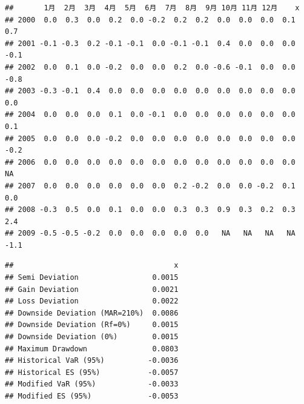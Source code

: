 \documentclass{article}\usepackage[]{graphicx}\usepackage[]{color}
\makeatletter
\newenvironment{kframe}{%
 \def\at@end@of@kframe{}%
 \ifinner\ifhmode%
  \def\at@end@of@kframe{\end{minipage}}%
  \begin{minipage}{\columnwidth}%
 \fi\fi%
 \def\FrameCommand##1{\hskip\@totalleftmargin \hskip-\fboxsep
 \colorbox{shadecolor}{##1}\hskip-\fboxsep
     \hskip-\linewidth \hskip-\@totalleftmargin \hskip\columnwidth}%
 \MakeFramed {\advance\hsize-\width
   \@totalleftmargin\z@ \linewidth\hsize
   \@setminipage}}%
 {\par\unskip\endMakeFramed%
 \at@end@of@kframe}
\newenvironment{knitrout}{}{} %
\makeatother
\begin{document}
\begin{CJK*}{UTF8}{gkai}
\begin{knitrout}
\end{knitrout}
\begin{knitrout}
\color{fgcolor}\begin{kframe}
\begin{verbatim}
##       1月  2月  3月  4月  5月  6月  7月  8月  9月 10月 11月 12月    x
## 2000  0.0  0.3  0.0  0.2  0.0 -0.2  0.2  0.2  0.0  0.0  0.0  0.1  0.7
## 2001 -0.1 -0.3  0.2 -0.1 -0.1  0.0 -0.1 -0.1  0.4  0.0  0.0  0.0 -0.1
## 2002  0.0  0.1  0.0 -0.2  0.0  0.0  0.2  0.0 -0.6 -0.1  0.0  0.0 -0.8
## 2003 -0.3 -0.1  0.4  0.0  0.0  0.0  0.0  0.0  0.0  0.0  0.0  0.0  0.0
## 2004  0.0  0.0  0.0  0.1  0.0 -0.1  0.0  0.0  0.0  0.0  0.0  0.0  0.1
## 2005  0.0  0.0  0.0 -0.2  0.0  0.0  0.0  0.0  0.0  0.0  0.0  0.0 -0.2
## 2006  0.0  0.0  0.0  0.0  0.0  0.0  0.0  0.0  0.0  0.0  0.0  0.0   NA
## 2007  0.0  0.0  0.0  0.0  0.0  0.0  0.2 -0.2  0.0  0.0 -0.2  0.1  0.0
## 2008 -0.3  0.5  0.0  0.1  0.0  0.0  0.3  0.3  0.9  0.3  0.2  0.3  2.4
## 2009 -0.5 -0.5 -0.2  0.0  0.0  0.0  0.0  0.0   NA   NA   NA   NA -1.1
\end{verbatim}
\end{kframe}
\end{knitrout}
\begin{knitrout}
\color{fgcolor}\begin{kframe}
\begin{verbatim}
##                                     x
## Semi Deviation                 0.0015
## Gain Deviation                 0.0021
## Loss Deviation                 0.0022
## Downside Deviation (MAR=210%)  0.0086
## Downside Deviation (Rf=0%)     0.0015
## Downside Deviation (0%)        0.0015
## Maximum Drawdown               0.0803
## Historical VaR (95%)          -0.0036
## Historical ES (95%)           -0.0057
## Modified VaR (95%)            -0.0033
## Modified ES (95%)             -0.0053
\end{verbatim}
\end{kframe}
\end{knitrout}

\newpage
\end{CJK*}
\end{document}
